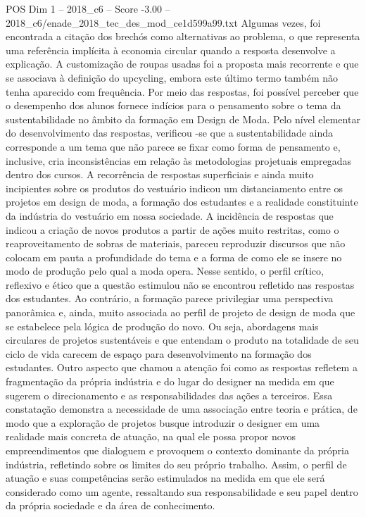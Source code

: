 \begin{textsample}{POS Dim 1 – 2018\_c6 – Score -3.00 – 2018\_c6/enade\_2018\_tec\_des\_mod\_ce1d599a99.txt}
Algumas vezes, foi encontrada a citação dos brechós como alternativas ao problema, o que representa uma referência implícita à economia circular quando a resposta desenvolve a explicação.
A customização de roupas usadas foi a proposta mais recorrente e que se associava à definição do upcycling, embora este último termo também não tenha aparecido com frequência.
Por meio das respostas, foi possível perceber que o desempenho dos alunos fornece indícios para o pensamento sobre o tema da sustentabilidade no âmbito da formação em Design de Moda.
Pelo nível elementar do desenvolvimento das respostas, verificou -se que a sustentabilidade ainda corresponde a um tema que não parece se fixar como forma de pensamento e, inclusive, cria inconsistências em relação às metodologias projetuais empregadas dentro dos cursos.
A recorrência de respostas superficiais e ainda muito incipientes sobre os produtos do vestuário indicou um distanciamento entre os projetos em design de moda, a formação dos estudantes e a realidade constituinte da indústria do vestuário em nossa sociedade.
A incidência de respostas que indicou a criação de novos produtos a partir de ações muito restritas, como o reaproveitamento de sobras de materiais, pareceu reproduzir discursos que não colocam em pauta a profundidade do tema e a forma de como ele se insere no modo de produção pelo qual a moda opera.
Nesse sentido, o perfil crítico, reflexivo e ético que a questão estimulou não se encontrou refletido nas respostas dos estudantes.
Ao contrário, a formação parece privilegiar uma perspectiva panorâmica e, ainda, muito associada ao perfil de projeto de design de moda que se estabelece pela lógica de produção do novo.
Ou seja, abordagens mais circulares de projetos sustentáveis e que entendam o produto na totalidade de seu ciclo de vida carecem de espaço para desenvolvimento na formação dos estudantes.
Outro aspecto que chamou a atenção foi como as respostas refletem a fragmentação da própria indústria e do lugar do designer na medida em que sugerem o direcionamento e as responsabilidades das ações a terceiros.
Essa constatação demonstra a necessidade de uma associação entre teoria e prática, de modo que a exploração de projetos busque introduzir o designer em uma realidade mais concreta de atuação, na qual ele possa propor novos empreendimentos que dialoguem e provoquem o contexto dominante da própria indústria, refletindo sobre os limites do seu próprio trabalho.
Assim, o perfil de atuação e suas competências serão estimulados na medida em que ele será considerado como um agente, ressaltando sua responsabilidade e seu papel dentro da própria sociedade e da área de conhecimento.

\end{textsample}
